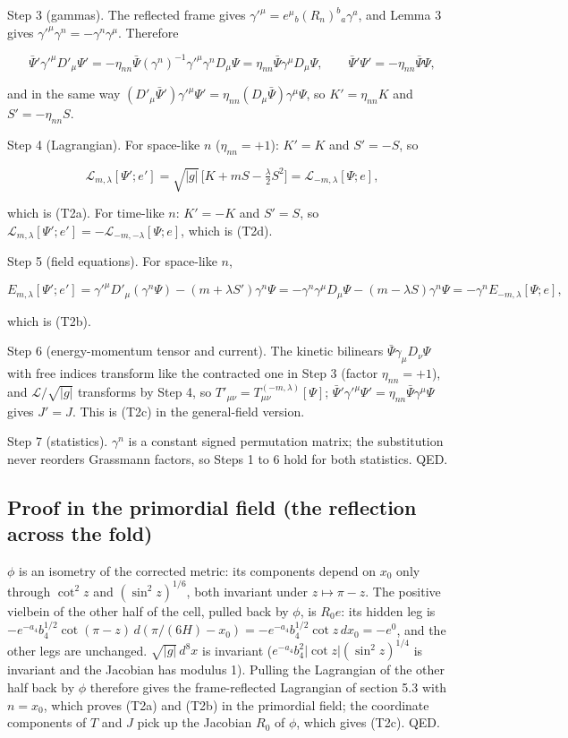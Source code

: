\documentclass[11pt]{article}
\begin{document}
Step 3 (gammas). The reflected frame gives $\gamma'^\mu = e^\mu{}_b(R_n)^b{}_a\gamma^a$, and Lemma 3 gives $\gamma'^\mu\gamma^n = -\gamma^n\gamma^\mu$. Therefore

\[
\bar\Psi'\gamma'^\mu D'_\mu\Psi' = -\eta_{nn}\bar\Psi(\gamma^n)^{-1}\gamma'^\mu\gamma^nD_\mu\Psi = \eta_{nn}\bar\Psi\gamma^\mu D_\mu\Psi ,
\qquad
\bar\Psi'\Psi' = -\eta_{nn}\bar\Psi\Psi ,
\]

and in the same way $(D'_\mu\bar\Psi')\gamma'^\mu\Psi' = \eta_{nn}(D_\mu\bar\Psi)\gamma^\mu\Psi$, so $K' = \eta_{nn}K$ and $S' = -\eta_{nn}S$.

Step 4 (Lagrangian). For space-like $n$ ($\eta_{nn} = +1$): $K' = K$ and $S' = -S$, so

\[
\mathcal{L}_{m,\lambda}[\Psi';e'] = \sqrt{|g|}\,\big[K + mS - \tfrac{\lambda}{2}S^2\big] = \mathcal{L}_{-m,\lambda}[\Psi;e] ,
\]

which is (T2a). For time-like $n$: $K' = -K$ and $S' = S$, so $\mathcal{L}_{m,\lambda}[\Psi';e'] = -\mathcal{L}_{-m,-\lambda}[\Psi;e]$, which is (T2d).

Step 5 (field equations). For space-like $n$,

\[
E_{m,\lambda}[\Psi';e'] = \gamma'^\mu D'_\mu(\gamma^n\Psi) - (m + \lambda S')\gamma^n\Psi = -\gamma^n\gamma^\mu D_\mu\Psi - (m - \lambda S)\gamma^n\Psi = -\gamma^nE_{-m,\lambda}[\Psi;e] ,
\]

which is (T2b).

Step 6 (energy-momentum tensor and current). The kinetic bilinears $\bar\Psi\gamma_\mu D_\nu\Psi$ with free indices transform like the contracted one in Step 3 (factor $\eta_{nn} = +1$), and $\mathcal{L}/\sqrt{|g|}$ transforms by Step 4, so $T'_{\mu\nu} = T^{(-m,\lambda)}_{\mu\nu}[\Psi]$; $\bar\Psi'\gamma'^\mu\Psi' = \eta_{nn}\bar\Psi\gamma^\mu\Psi$ gives $J' = J$. This is (T2c) in the general-field version.

Step 7 (statistics). $\gamma^n$ is a constant signed permutation matrix; the substitution never reorders Grassmann factors, so Steps 1 to 6 hold for both statistics. QED.

\subsection{Proof in the primordial field (the reflection across the fold)}

$\phi$ is an isometry of the corrected metric: its components depend on $x_0$ only through $\cot^2 z$ and $(\sin^2 z)^{1/6}$, both invariant under $z \mapsto \pi - z$. The positive vielbein of the other half of the cell, pulled back by $\phi$, is $R_0e$: its hidden leg is $-e^{-a_4}b_4^{1/2}\cot(\pi - z)\,d(\pi/(6H) - x_0) = -e^{-a_4}b_4^{1/2}\cot z\,dx_0 = -e^0$, and the other legs are unchanged. $\sqrt{|g|}\,d^8x$ is invariant ($e^{-a_4}b_4^2|\cot z|(\sin^2 z)^{1/4}$ is invariant and the Jacobian has modulus 1). Pulling the Lagrangian of the other half back by $\phi$ therefore gives the frame-reflected Lagrangian of section 5.3 with $n = x_0$, which proves (T2a) and (T2b) in the primordial field; the coordinate components of $T$ and $J$ pick up the Jacobian $R_0$ of $\phi$, which gives (T2c). QED.
\end{document}
